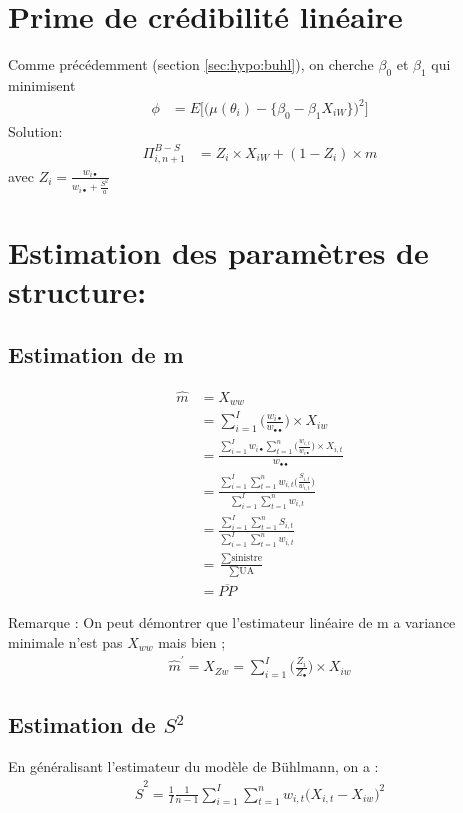 \documentclass[11pt,french]{report}
\begin{document}
\section{Prime de crédibilité linéaire}
Comme précédemment (section \ref{sec:hypo:buhl}), on cherche $\beta_0$ et $\beta_1$ qui minimisent 
\begin{align*}
\phi &= E \Big[ \big( \mu(\theta_i) - \lbrace \beta_0 -\beta_1 X_{i W} \rbrace \big)^2  \Big]
\end{align*}
Solution: 
\begin{align*}
\Pi_{i, n+1}^{B-S} &= Z_i \times X_{i W} + (1 - Z_i) \times m
\end{align*}
avec $Z_i = \frac{w_{i \bullet}}{w_{i \bullet} + \frac{S^2}{a}}$

\section{Estimation des paramètres de structure:}

\subsection{Estimation de m}
\begin{align*}
\widehat{m} &= X_{ww} \\
&= \sum_{i=1}^{I} \Big(\frac{w_{i \bullet}}{w_{\bullet \bullet}} \Big) \times X_{iw} \\
&= \frac{\sum_{i=1}^{I} w _{i \bullet} \sum_{t=1}^{n} \Big(\frac{w_{i, t}}{w_{i \bullet}} \Big) \times X_{i,t}}{w_{\bullet \bullet}}\\
&= \frac{\sum_{i=1}^{I} \sum_{t=1}^{n} w_{i, t}\Big(\frac{S_{i,t}}{w_{i,t}} \Big)}{\sum_{i=1}^{I} \sum_{t=1}^{n} w_{i,t}}\\
&= \frac{\sum_{i=1}^{I} \sum_{t=1}^{n} S_{i,t}}{\sum_{i=1}^{I} \sum_{t=1}^{n} w_{i,t}}\\
&= \frac{\sum \text{sinistre}}{\sum \text{UA}} \\
&= \overline{PP}
\end{align*}

Remarque :
On peut démontrer que l'estimateur linéaire de m a variance minimale n'est pas $X_{ww}$ mais bien ;
\begin{align*}
\widehat{m}^{'} = X_{Zw} = \sum_{i=1}^{I} \Big(\frac{Z_i}{Z_{\bullet}} \Big) \times X_{iw}
\end{align*}

\subsection{Estimation de $S^2$}
En généralisant l'estimateur du modèle de Bühlmann, on a :
\begin{align*}
\widehat{S}^2 = \frac{1}{I} \frac{1}{n-1} \sum_{i=1}^{I} \sum_{t=1}^{n} w_{i,t} \Big( X_{i,t} - X_{iw}\Big)^2 
\end{align*}
\end{document}
